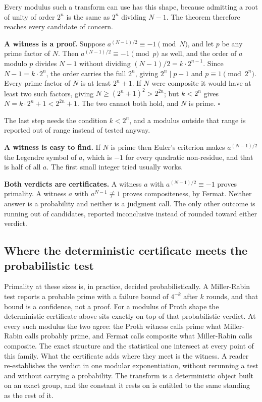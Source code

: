 \documentclass{article}
\begin{document}
Every modulus such a transform can use has this shape, because admitting a root of unity of order \(2^n\) is the same as \(2^n\) dividing \(N-1\). The theorem therefore reaches every candidate of concern.

\textbf{A witness is a proof.} Suppose \(a^{(N-1)/2} \equiv -1 \pmod N\), and let \(p\) be any prime factor of \(N\). Then \(a^{(N-1)/2} \equiv -1 \pmod p\) as well, and the order of \(a\) modulo \(p\) divides \(N-1\) without dividing \((N-1)/2 = k \cdot 2^{n-1}\). Since \(N - 1 = k \cdot 2^n\), the order carries the full \(2^n\), giving \(2^n \mid p-1\) and \(p \equiv 1 \pmod{2^n}\). Every prime factor of \(N\) is at least \(2^n + 1\). If \(N\) were composite it would have at least two such factors, giving \(N \ge (2^n+1)^2 > 2^{2n}\); but \(k < 2^n\) gives \(N = k \cdot 2^n + 1 < 2^{2n} + 1\). The two cannot both hold, and \(N\) is prime. \(\square\)

The last step needs the condition \(k < 2^n\), and a modulus outside that range is reported out of range instead of tested anyway.

\textbf{A witness is easy to find.} If \(N\) is prime then Euler's criterion makes \(a^{(N-1)/2}\) the Legendre symbol of \(a\), which is \(-1\) for every quadratic non-residue, and that is half of all \(a\). The first small integer tried usually works.

\textbf{Both verdicts are certificates.} A witness \(a\) with \(a^{(N-1)/2} \equiv -1\) proves primality. A witness \(a\) with \(a^{N-1} \not\equiv 1\) proves compositeness, by Fermat. Neither answer is a probability and neither is a judgment call. The only other outcome is running out of candidates, reported inconclusive instead of rounded toward either verdict.

\subsection{Where the deterministic certificate meets the probabilistic test}

Primality at these sizes is, in practice, decided probabilistically. A Miller-Rabin test reports a probable prime with a failure bound of \(4^{-k}\) after \(k\) rounds, and that bound is a confidence, not a proof. For a modulus of Proth shape the deterministic certificate above sits exactly on top of that probabilistic verdict. At every such modulus the two agree: the Proth witness calls prime what Miller-Rabin calls probably prime, and Fermat calls composite what Miller-Rabin calls composite. The exact structure and the statistical one intersect at every point of this family. What the certificate adds where they meet is the witness. A reader re-establishes the verdict in one modular exponentiation, without rerunning a test and without carrying a probability. The transform is a deterministic object built on an exact group, and the constant it rests on is entitled to the same standing as the rest of it.
\end{document}
